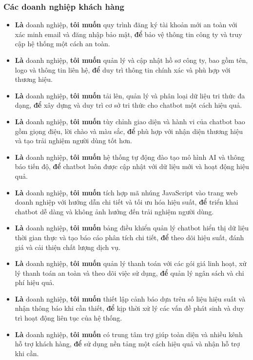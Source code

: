 \subsubsection{Các doanh nghiệp khách hàng}
\begin{itemize}
    \item \textbf{Là} doanh nghiệp, \textbf{tôi muốn} quy trình đăng ký tài khoản mới an toàn với xác minh email và đăng nhập bảo mật, \textbf{để} bảo vệ thông tin công ty và truy cập hệ thống một cách an toàn.
    \item \textbf{Là} doanh nghiệp, \textbf{tôi muốn} quản lý và cập nhật hồ sơ công ty, bao gồm tên, logo và thông tin liên hệ, \textbf{để} duy trì thông tin chính xác và phù hợp với thương hiệu.
    \item \textbf{Là} doanh nghiệp, \textbf{tôi muốn} tải lên, quản lý và phân loại dữ liệu tri thức đa dạng, \textbf{để} xây dựng và duy trì cơ sở tri thức cho chatbot một cách hiệu quả.
    \item \textbf{Là} doanh nghiệp, \textbf{tôi muốn} tùy chỉnh giao diện và hành vi của chatbot bao gồm giọng điệu, lời chào và màu sắc, \textbf{để} phù hợp với nhận diện thương hiệu và tạo trải nghiệm người dùng tốt hơn.
    \item \textbf{Là} doanh nghiệp, \textbf{tôi muốn} hệ thống tự động đào tạo mô hình AI và thông báo tiến độ, \textbf{để} chatbot luôn được cập nhật với dữ liệu mới và hoạt động hiệu quả.
    \item \textbf{Là} doanh nghiệp, \textbf{tôi muốn} tích hợp mã nhúng JavaScript vào trang web doanh nghiệp với hướng dẫn chi tiết và tối ưu hóa hiệu suất, \textbf{để} triển khai chatbot dễ dàng và không ảnh hưởng đến trải nghiệm người dùng.
    \item \textbf{Là} doanh nghiệp, \textbf{tôi muốn} bảng điều khiển quản lý chatbot hiển thị dữ liệu thời gian thực và tạo báo cáo phân tích chi tiết, \textbf{để} theo dõi hiệu suất, đánh giá và cải thiện chất lượng dịch vụ.
    \item \textbf{Là} doanh nghiệp, \textbf{tôi muốn} quản lý thanh toán với các gói giá linh hoạt, xử lý thanh toán an toàn và theo dõi việc sử dụng, \textbf{để} quản lý ngân sách và chi phí hiệu quả.
    \item \textbf{Là} doanh nghiệp, \textbf{tôi muốn} thiết lập cảnh báo dựa trên số liệu hiệu suất và nhận thông báo khi cần thiết, \textbf{để} kịp thời xử lý các vấn đề phát sinh và duy trì hoạt động liên tục của hệ thống.
    \item \textbf{Là} doanh nghiệp, \textbf{tôi muốn} có trung tâm trợ giúp toàn diện và nhiều kênh hỗ trợ khách hàng, \textbf{để} sử dụng nền tảng một cách hiệu quả và nhận hỗ trợ khi cần.
\end{itemize}

